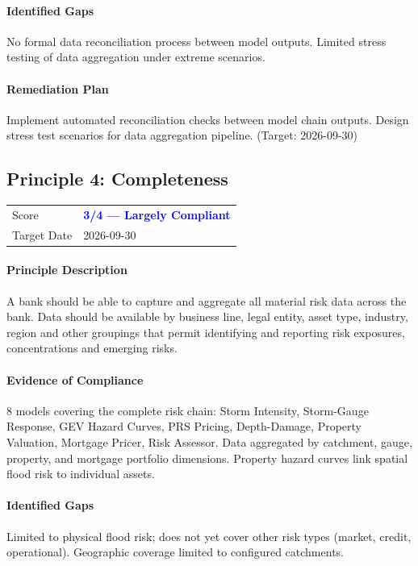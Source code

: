 \documentclass[11pt]{article}
\begin{document}
\paragraph{Identified Gaps}
No formal data reconciliation process between model outputs. Limited stress testing of data aggregation under extreme scenarios.

\paragraph{Remediation Plan}
Implement automated reconciliation checks between model chain outputs. Design stress test scenarios for data aggregation pipeline. (Target: 2026-09-30)

\subsection{Principle 4: Completeness}

\begin{table}[H]
    \centering
    \begin{tabular}{ll}
        \toprule
        Score & \textcolor{blue}{\textbf{3/4 --- Largely Compliant}} \\
        Target Date & 2026-09-30 \\
        \bottomrule
    \end{tabular}
\end{table}

\paragraph{Principle Description}
A bank should be able to capture and aggregate all material risk data across the bank. Data should be available by business line, legal entity, asset type, industry, region and other groupings that permit identifying and reporting risk exposures, concentrations and emerging risks.

\paragraph{Evidence of Compliance}
8 models covering the complete risk chain: Storm Intensity, Storm-Gauge Response, GEV Hazard Curves, PRS Pricing, Depth-Damage, Property Valuation, Mortgage Pricer, Risk Assessor. Data aggregated by catchment, gauge, property, and mortgage portfolio dimensions. Property hazard curves link spatial flood risk to individual assets.

\paragraph{Identified Gaps}
Limited to physical flood risk; does not yet cover other risk types (market, credit, operational). Geographic coverage limited to configured catchments.
\end{document}
